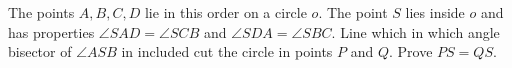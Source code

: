 The points $A, B, C, D$ lie in this order on a circle $o$.  The point $S$ lies inside $o$ and has properties $\angle SAD=\angle SCB$ and $\angle SDA= \angle SBC$. Line which in which angle bisector of $\angle ASB$ in included cut the circle in points  $P$ and $Q$. Prove $PS =QS$.